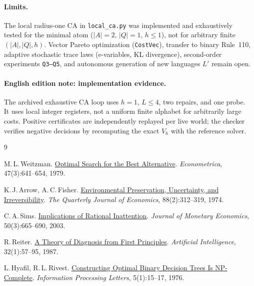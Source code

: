 \documentclass[11pt,a4paper]{article}
\theoremstyle{preprintthm}
\theoremstyle{preprintdef}
\begin{document}
\paragraph{Limits.}
The local radius-one CA in \texttt{local\_ca.py} was implemented and exhaustively tested for the minimal atom ($|A|=2$, $|Q|=1$, $h\le1$), not for arbitrary finite $(|A|,|Q|,h)$. Vector Pareto optimization (\texttt{CostVec}), transfer to binary Rule~110, adaptive stochastic trace laws (e-variables, KL divergence), second-order experiments \texttt{Q3--Q5}, and autonomous generation of new languages $L'$ remain open.
\paragraph{English edition note: implementation evidence.} The archived exhaustive CA loop uses $h=1$, $L\le4$, two repairs, and one probe. It uses local integer registers, not a uniform finite alphabet for arbitrarily large costs. Positive certificates are independently replayed per live world; the checker verifies negative decisions by recomputing the exact $V_h$ with the reference solver.

\begin{thebibliography}{9}
\small\setlength{\itemsep}{1pt}

M.\,L.\,Weitzman. \href{https://scholar.harvard.edu/files/weitzman/files/optimalsearchbestalternative.pdf}{Optimal Search for the Best Alternative}. \emph{Econometrica}, 47(3):641--654, 1979.

K.\,J.\,Arrow, A.\,C.\,Fisher. \href{https://doi.org/10.2307/1883074}{Environmental Preservation, Uncertainty, and Irreversibility}. \emph{The Quarterly Journal of Economics}, 88(2):312--319, 1974.

C.\,A.\,Sims. \href{https://doi.org/10.1016/S0304-3932(03)00029-1}{Implications of Rational Inattention}. \emph{Journal of Monetary Economics}, 50(3):665--690, 2003.

R.\,Reiter. \href{https://doi.org/10.1016/0004-3702(87)90062-2}{A Theory of Diagnosis from First Principles}. \emph{Artificial Intelligence}, 32(1):57--95, 1987.

L.\,Hyafil, R.\,L.\,Rivest. \href{https://www.sciencedirect.com/science/article/abs/pii/0020019076900958}{Constructing Optimal Binary Decision Trees Is NP-Complete}. \emph{Information Processing Letters}, 5(1):15--17, 1976.

\end{thebibliography}
\end{document}
